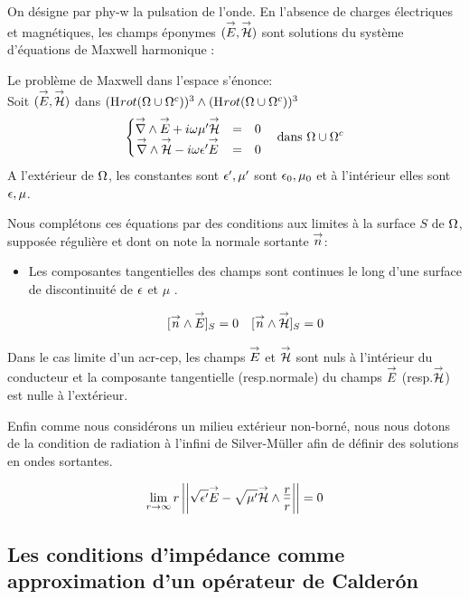 On désigne par \gls{phy-w} la pulsation de l'onde.
En l'absence de charges électriques et magnétiques, les champs éponymes $( {\overset{\rightarrow}{E}}, {\overset{\rightarrow}{\mathcal{H}}} )$ sont solutions du système d'équations de Maxwell harmonique : 

Le problème de Maxwell dans l'espace s'énonce: \\

Soit $({\overset{\rightarrow}{E}},{\overset{\rightarrow}{\mathcal{H}}})$ dans $(\mathrm{H}_\mathrm{{}}{rot}(\Omega\cup\Omega^c))^3 \wedge (\mathrm{H}_\mathrm{{}}{rot}(\Omega\cup\Omega^c))^3$
\begin{equation}
\label{eq:pres_th:intro:maxwell}
\left\lbrace \begin{matrix}
{\overset{\rightarrow}{\nabla}}\wedge {\overset{\rightarrow}{E}} + i\omega\mu' {\overset{\rightarrow}{\mathcal{H}}} &=& 0 \\
{\overset{\rightarrow}{\nabla}}\wedge {\overset{\rightarrow}{\mathcal{H}}} - i\omega\epsilon' {\overset{\rightarrow}{E}} &=& 0 \\
\end{matrix} \right.
\quad \text{dans $\Omega\cup\Omega^c$}
\end{equation}
A l'extérieur de $\Omega$, les constantes sont $\epsilon',\mu'$ sont $\epsilon_0,\mu_0$ et à l'intérieur elles sont $\epsilon,\mu$.


Nous complétons ces équations par des conditions aux limites à la surface $S$ de $\Omega$, supposée régulière et dont on note la normale sortante ${\overset{\rightarrow}{n}}$:
\begin{itemize}
  \item Les composantes tangentielles des champs sont continues le long d'une surface de discontinuité de $\epsilon$ et $\mu$ \cite[(2.10) p.~8]{senior_approximate_1995}.

  \begin{align}
  \label{eq:pres_th:intro:transmissions}[{\overset{\rightarrow}{n}} \wedge {\overset{\rightarrow}{E}}]_S = 0  \quad [{\overset{\rightarrow}{n}} \wedge {\overset{\rightarrow}{\mathcal{H}}}]_S = 0
  \end{align}
\end{itemize}
Dans le cas limite d'un \gls{acr-cep}, les champs ${\overset{\rightarrow}{E}}$ et ${\overset{\rightarrow}{\mathcal{H}}}$ sont nuls à l'intérieur du conducteur et la composante tangentielle (resp.normale) du champs ${\overset{\rightarrow}{E}}$ (resp.${\overset{\rightarrow}{\mathcal{H}}}$) est nulle à l'extérieur.


Enfin comme nous considérons un milieu extérieur non-borné, nous nous dotons de la condition de radiation à l'infini de Silver-Müller afin de définir des solutions en ondes sortantes.


\begin{equation}
\label{eq:pres_th:intro:silver-muller}
\lim_{r\rightarrow\infty} r \left|\left|\sqrt{\epsilon'}{\overset{\rightarrow}{E}} - \sqrt{\mu'}{\overset{\rightarrow}{\mathcal{H}}}\wedge\dfrac{\underline{r}}{r}\right|\right| = 0
\end{equation} 

\subsection*{Les conditions d'impédance comme approximation d'un opérateur de Calderón}


